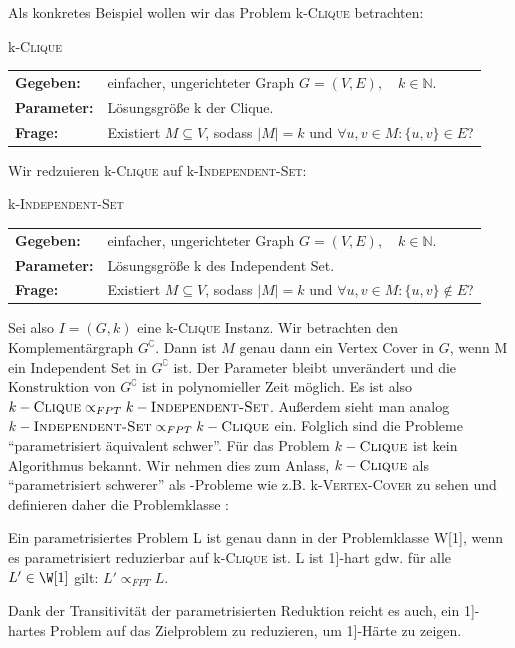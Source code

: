 \documentclass[a4paper,ngerman]{atseminar}
\newcommand{\N}{\ensuremath{\mathbb{N}}\xspace}
\begin{document}
\noindent
Als konkretes Beispiel wollen wir das Problem k-\textsc{Clique} betrachten:

\begin{definition}{k-\textsc{Clique}}
  \\
  \begin{tabular}{ll}
    \textbf{Gegeben:} & einfacher, ungerichteter Graph  $G = (V, E), \quad k \in \N$. \\
    \textbf{Parameter:} & Lösungsgröße k der Clique. \\
    \textbf{Frage:} & Existiert $M \subseteq V$, sodass $ |M| = k $ und $ \forall u, v \in M : \{u, v\} \in E$?
  \end{tabular}
\end{definition}

\noindent
Wir redzuieren k-\textsc{Clique} auf k-\textsc{Independent-Set}:

\begin{definition}{k-\textsc{Independent-Set}}
  \\
  \begin{tabular}{ll}
    \textbf{Gegeben:} & einfacher, ungerichteter Graph  $G = (V, E), \quad k \in \N$. \\
    \textbf{Parameter:} & Lösungsgröße k des Independent Set. \\
    \textbf{Frage:} & Existiert $M \subseteq V$, sodass $ |M| = k $ und $ \forall u, v \in M : \{u, v\} \not\in E$?
  \end{tabular}
\end{definition}

\noindent
Sei also $I = (G, k)$ eine k-\textsc{Clique} Instanz. Wir betrachten den Komplementärgraph $G^\complement$.
Dann ist $M$ genau dann ein Vertex Cover in $G$, wenn M ein Independent Set in $G^\complement$ ist.
Der Parameter bleibt unverändert und die Konstruktion von $G^\complement$ ist in polynomieller Zeit möglich. 
Es ist also $k-\textsc{Clique} \propto_{FPT} k-\textsc{Independent-Set}$. Außerdem sieht man analog $k-\textsc{Independent-Set} \propto_{FPT} k-\textsc{Clique} $ ein.
Folglich sind die Probleme \enquote{parametrisiert äquivalent schwer}.
Für das Problem $k-\textsc{Clique}$ ist kein \FPT Algorithmus bekannt. Wir nehmen dies zum Anlass, $k-\textsc{Clique}$ als \enquote{parametrisiert schwerer} als
\FPT-Probleme wie z.B. k-\textsc{Vertex-Cover} zu sehen und definieren daher die Problemklasse \W[1]:

\begin{definition}
  Ein parametrisiertes Problem L ist genau dann in der Problemklasse W{[}1{]}, wenn es parametrisiert reduzierbar auf k-\textsc{Clique} ist.
  L ist \W{[}1{]}-hart gdw. für alle $L' \in \W[1]$ gilt: $L' \propto_{FPT} L$.
\end{definition}
\noindent
Dank der Transitivität der parametrisierten Reduktion reicht es auch, ein \W{[}1{]}-hartes Problem auf das Zielproblem zu reduzieren, um
\W{[}1{]}-Härte zu zeigen.
\end{document}
